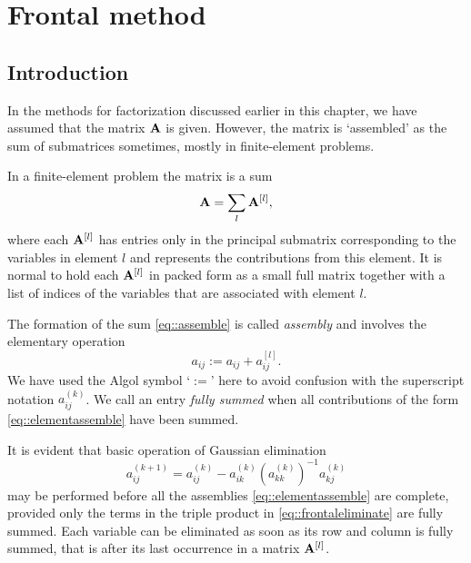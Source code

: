 \section{Frontal method}
\subsection{Introduction}
\begin{exm}
    In the methods for factorization discussed earlier in this 
    chapter, we have assumed that the matrix ${\mathbf{A}}$ is given. 
    However, the matrix is `assembled' as the sum of 
    submatrices sometimes, mostly in finite-element problems. 

    In a finite-element problem the matrix is a sum
    \begin{equation}
        \label{eq::assemble}
        {\mathbf{A}}=\sum_l{\mathbf{A}}^{[l]},
    \end{equation}
    where each ${\mathbf{A}}^{[l]}$ has entries only in the principal 
    submatrix corresponding to the variables in element $l$ 
    and represents the contributions from this element. It is 
    normal to hold each ${\mathbf{A}}^{[l]}$ in packed form as a small 
    full matrix together with a list of indices of the 
    variables that are associated with element $l$.
\end{exm}

\begin{defn}
    The formation of the sum \eqref{eq::assemble} is called 
    \textit{assembly} and involves the elementary operation
    \begin{equation}
        \label{eq::elementassemble}
        a_{ij}:=a_{ij}+a_{ij}^{[l]}.
    \end{equation}
    We have used the Algol symbol ‘$:=$’ here to avoid 
    confusion with the superscript notation $a_{ij}^{(k)}$. 
    We call an entry \textit{fully summed} when all 
    contributions of the form \eqref{eq::elementassemble} have 
    been summed.
\end{defn}

\begin{lem}
    \label{lem::frontaleliminate}
    It is evident that basic operation of Gaussian elimination
    \begin{equation}
        \label{eq::frontaleliminate}
        a_{ij}^{(k+1)}=a_{ij}^{(k)}-a_{ik}^{(k)}(a_{kk}^{(k)})^
        {-1}a_{kj}^{(k)}
    \end{equation}
    may be performed before all the assemblies 
    \eqref{eq::elementassemble} are complete, provided only the 
    terms in the triple product in \eqref{eq::frontaleliminate} 
    are fully summed. Each variable can be eliminated as soon 
    as its row and column is fully summed, that is after its 
    last occurrence in a matrix ${\mathbf{A}}^{[l]}$.
\end{lem}

